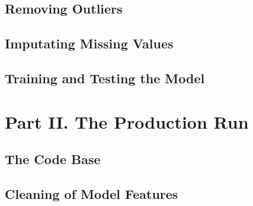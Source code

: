 \documentclass[12pt]{article}
\begin{document}
\subsection{Removing Outliers}

\subsection{Imputating Missing Values}


\subsection{Training and Testing the Model}






\section{Part II. The Production Run}

\subsection{The Code Base}



\subsection{Cleaning of Model Features}
\end{document}
